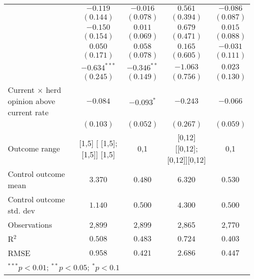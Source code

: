 \begin{table}
\begin{center}
\begin{tabular}{l c c c c}
                                                 & $-0.119$                     & $-0.016$       & $0.561$                       & $-0.086$       \\
                                                 & $(0.144)$                    & $(0.078)$      & $(0.394)$                     & $(0.087)$      \\
                                                 & $-0.150$                     & $0.011$        & $0.679$                       & $0.015$        \\
                                                 & $(0.154)$                    & $(0.069)$      & $(0.471)$                     & $(0.088)$      \\
                                                 & $0.050$                      & $0.058$        & $0.165$                       & $-0.031$       \\
                                                 & $(0.171)$                    & $(0.078)$      & $(0.605)$                     & $(0.111)$      \\
                                                 & $-0.634^{***}$               & $-0.346^{**}$  & $-1.063$                      & $0.023$        \\
                                                 & $(0.245)$                    & $(0.149)$      & $(0.756)$                     & $(0.130)$      \\
Current $\times$ herd opinion above current rate & $-0.084$                     & $-0.093^{*}$   & $-0.243$                      & $-0.066$       \\
                                                 & $(0.103)$                    & $(0.052)$      & $(0.267)$                     & $(0.059)$      \\
\hline
Outcome range                                    & [1,5] [ [1,5];  [1,5]] [1,5] & {0,1}          & [0,12] [[0,12]; [0,12]][0,12] & {0,1}          \\
Control outcome mean                             & $3.370$                      & $0.480$        & $6.320$                       & $0.530$        \\
Control outcome std. dev                         & $1.140$                      & $0.500$        & $4.300$                       & $0.500$        \\
Observations                                     & 2,899                        & 2,899          & 2,865                         & 2,770          \\
R$^{2}$                                          & $0.508$                      & $0.483$        & $0.724$                       & $0.403$        \\
RMSE                                             & $0.958$                      & $0.421$        & $2.686$                       & $0.447$        \\
\hline
\multicolumn{5}{l}{\scriptsize{$^{***}p<0.01$; $^{**}p<0.05$; $^{*}p<0.1$}}
\end{tabular}
\caption{}
\label{table:SI_table35_currentherdint_rake}
\end{center}
\end{table}
